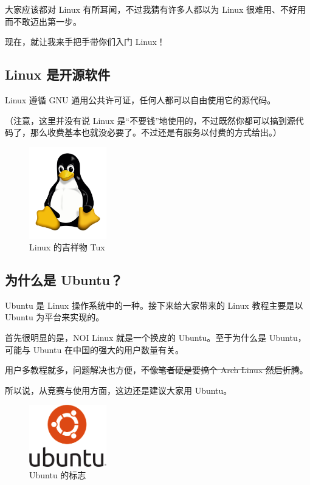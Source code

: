 \documentclass[UTF-8]{ctexart}
\begin{document}
		大家应该都对 Linux 有所耳闻，不过我猜有许多人都以为 Linux 很难用、不好用而不敢迈出第一步。
		
		现在，就让我来手把手带你们入门 Linux！
	
		\subsection{Linux 是开源软件}
		
			Linux 遵循 GNU 通用公共许可证，任何人都可以自由使用它的源代码。
			
			（注意，这里并没有说 Linux 是“不要钱”地使用的，不过既然你都可以搞到源代码了，那么收费基本也就没必要了。不过还是有服务以付费的方式给出。）
			
			\begin{figure}[H]
				\centering
				\includegraphics[width=0.3\textwidth]{fig/tux.png}
				\caption*{Linux 的吉祥物 Tux}
			\end{figure}
			
		\subsection{为什么是 Ubuntu？}
		
			Ubuntu 是 Linux 操作系统中的一种。接下来给大家带来的 Linux 教程主要是以 Ubuntu 为平台来实现的。
		
			首先很明显的是，NOI Linux 就是一个换皮的 Ubuntu。至于为什么是 Ubuntu，可能与 Ubuntu 在中国的强大的用户数量有关。
			
			用户多教程就多，问题解决也方便，\sout{不像笔者硬是要搞个 Arch Linux 然后折腾}。
			
			所以说，从竞赛与使用方面，这边还是建议大家用 Ubuntu。
		
			\begin{figure}[H]
				\centering
				\includegraphics[width=0.3\textwidth]{fig/ubuntu.png}
				\caption*{Ubuntu 的标志}
			\end{figure}
		
\end{document}
